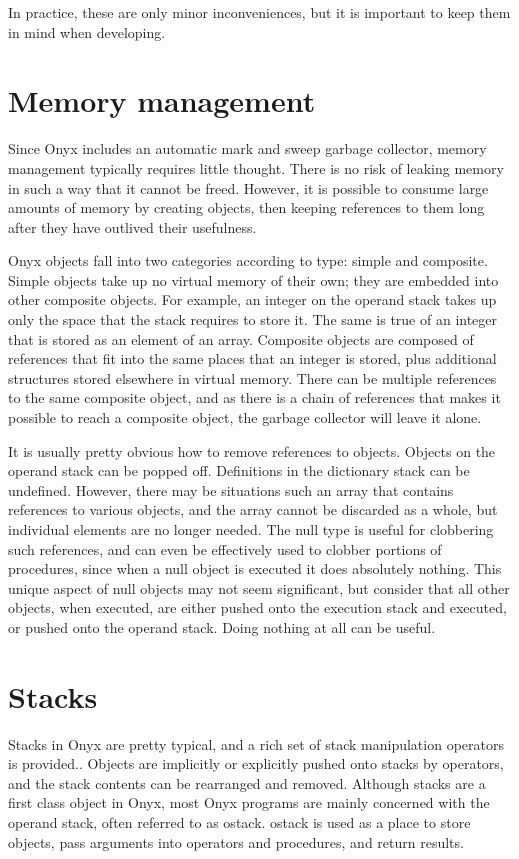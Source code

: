 In practice, these are only minor inconveniences, but it is important to keep
them in mind when developing.

\section{Memory management}

Since Onyx includes an automatic mark and sweep garbage collector, memory
management typically requires little thought.  There is no risk of leaking
memory in such a way that it cannot be freed.  However, it is possible to
consume large amounts of memory by creating objects, then keeping references to
them long after they have outlived their usefulness.

Onyx objects fall into two categories according to type: simple and composite.
Simple objects take up no virtual memory of their own; they are embedded into
other composite objects.  For example, an integer on the operand stack takes up
only the space that the stack requires to store it.  The same is true of an
integer that is stored as an element of an array.  Composite objects are
composed of references that fit into the same places that an integer is stored,
plus additional structures stored elsewhere in virtual memory.  There can be
multiple references to the same composite object, and as there is a chain of
references that makes it possible to reach a composite object, the garbage
collector will leave it alone.

It is usually pretty obvious how to remove references to objects.  Objects on
the operand stack can be popped off.  Definitions in the dictionary stack can be
undefined.  However, there may be situations such an array that contains
references to various objects, and the array cannot be discarded as a whole, but
individual elements are no longer needed.  The null type is useful for
clobbering such references, and can even be effectively used to clobber portions
of procedures, since when a null object is executed it does absolutely nothing.
This unique aspect of null objects may not seem significant, but consider that
all other objects, when executed, are either pushed onto the execution stack and
executed, or pushed onto the operand stack.  Doing nothing at all can be useful.

\section{Stacks}

Stacks in Onyx are pretty typical, and a rich set of stack manipulation
operators is provided..  Objects are implicitly or explicitly pushed onto stacks
by operators, and the stack contents can be rearranged and removed.  Although
stacks are a first class object in Onyx, most Onyx programs are mainly concerned
with the operand stack, often referred to as ostack.  ostack is used as a place
to store objects, pass arguments into operators and procedures, and return
results.

